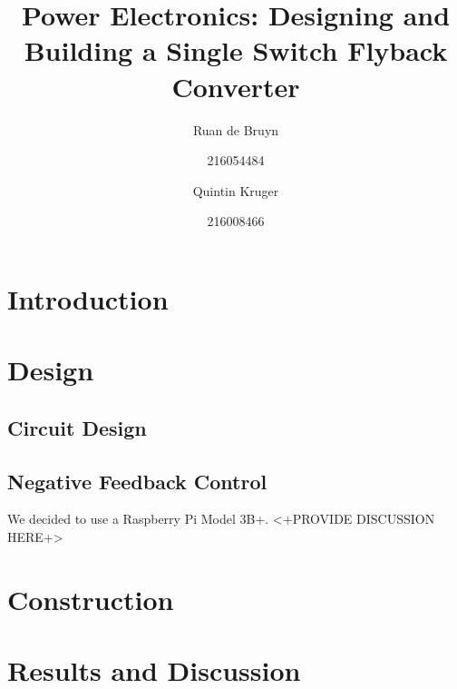 \documentclass[a4paper, 12pt]{article}
\title{Power Electronics: Designing and Building a Single Switch Flyback Converter}
\author{Ruan de Bruyn \and 216054484 \and Quintin Kruger \and 216008466}
\begin{document}
\maketitle
\newpage
{}
\tableofcontents
\listoffigures
\newpage
{}

\section{Introduction}


\section{Design}


\subsection{Circuit Design}


\subsection{Negative Feedback Control}

We decided to use a Raspberry Pi Model 3B+. <+PROVIDE DISCUSSION HERE+>


\section{Construction}


\section{Results and Discussion}

\end{document}
